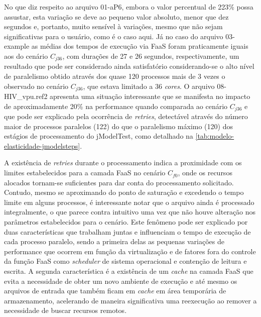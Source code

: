 \documentclass[english,brazilian]{UNISINOSmonografia} %
\begin{document}
No que diz respeito ao arquivo 01-aP6, embora o valor percentual de 223\% possa assustar, esta variação se deve ao pequeno valor absoluto, menor que dez segundos e, portanto, muito sensível à variações, mesmo que não sejam significativas para o usuário, como é o caso aqui.
%
Já no caso do arquivo 03-example as médias dos tempos de execução via FaaS foram praticamente iguais aos do cenário $C_{j36}$, com durações de 27 e 26 segundos, respectivamente, um resultado que pode ser considerado ainda satisfatório considerando-se o alto nível de paralelismo obtido através dos quase 120 processos mais de 3 vezes o observado no cenário $C_{j36}$, que estava limitado a 36 \textit{cores}.
%
O arquivo 08-HIV\_vpu.ref2 apresenta uma situação interessante que se manifesta no impacto de aproximadamente 20\% na performance quando comparada ao cenário $C_{j36}$ e que pode ser explicado pela ocorrência de \textit{retries}, detectável através do número maior de processos paralelos (122) do que o paralelismo máximo (120) dos estágios de processamento do jModelTest, como detalhado na \autoref{tab:modelo-elasticidade-jmodelsteps}.




A existência de \textit{retries} durante o processamento indica a proximidade com os limites estabelecidos para a camada FaaS no cenário $C_{f0}$, onde os recursos alocados tornam-se suficientes para dar conta do processamento solicitado.
%
Contudo, mesmo se aproximando do ponto de saturação e excedendo o tempo limite em alguns processos, é interessante notar que o arquivo ainda é processado integralmente, o que parece contra intuitivo uma vez que não houve alteração nos parâmetros estabelecidos para o cenário.
%
Este fenômeno pode ser explicado por duas características que trabalham juntas e influenciam o tempo de execução de cada processo paralelo, sendo a primeira delas as pequenas variações de performance que ocorrem em função da virtualização e de fatores fora do controle da função FaaS como \textit{scheduler} de sistema operacional e contenção de leitura e escrita.
%
A segunda característica é a existência de um \textit{cache} na camada FaaS que evita a necessidade de obter um novo ambiente de execução e até mesmo os arquivos de entrada que também ficam em \textit{cache} em área temporária de armazenamento, acelerando de maneira significativa uma reexecução ao remover a necessidade de buscar recursos remotos.
\end{document}
